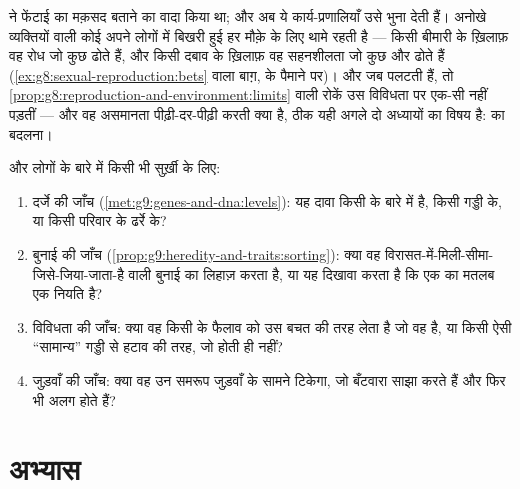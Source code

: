 \begin{proposition}[विविधता प्रजाति की बचत है, बैंक में रखी हुई]\label{prop:g9:unique-individuals:reserve}
 ने फेंटाई का मक़सद बताने का
वादा किया था; और अब ये कार्य-प्रणालियाँ उसे भुना देती हैं। अनोखे
व्यक्तियों वाली कोई  अपने लोगों में बिखरी हुई हर मौक़े के लिए
 थामे रहती है --- किसी बीमारी के ख़िलाफ़ वह रोध जो कुछ ढोते
हैं, और किसी दबाव के ख़िलाफ़ वह सहनशीलता जो कुछ और ढोते हैं
(\cref{ex:g8:sexual-reproduction:bets} वाला बाग़,  के पैमाने
पर)। और जब  पलटती हैं, तो
\cref{prop:g8:reproduction-and-environment:limits} वाली रोकें उस
विविधता पर एक-सी नहीं पड़तीं --- और वह असमानता पीढ़ी-दर-पीढ़ी करती क्या
है, ठीक यही अगले दो अध्यायों का विषय है:  का बदलना।
\end{proposition}
\admitted

\begin{method}[किसी ``आनुवंशिक'' दावे की जाँच]\label{met:g9:unique-individuals:claims}
 और लोगों के बारे में किसी भी सुर्ख़ी के लिए:
\begin{enumerate}
  \item दर्जे की जाँच (\cref{met:g9:genes-and-dna:levels}): यह दावा
        किसी  के बारे में है, किसी गड्डी के, या किसी परिवार के
        ढर्रे के?
  \item बुनाई की जाँच
        (\cref{prop:g9:heredity-and-traits:sorting}): क्या वह
        विरासत-में-मिली-सीमा-जिसे-जिया-जाता-है वाली बुनाई का लिहाज़
        करता है, या यह दिखावा करता है कि एक  का मतलब एक नियति है?
  \item विविधता की जाँच: क्या वह किसी  के फैलाव को उस बचत की तरह
        लेता है जो वह है, या किसी ऐसी ``सामान्य'' गड्डी से हटाव की
        तरह, जो होती ही नहीं?
  \item जुड़वाँ की जाँच: क्या वह उन समरूप जुड़वाँ के सामने टिकेगा, जो
        बँटवारा साझा करते हैं और फिर भी अलग होते हैं?
\end{enumerate}
\end{method}

\section{अभ्यास}

